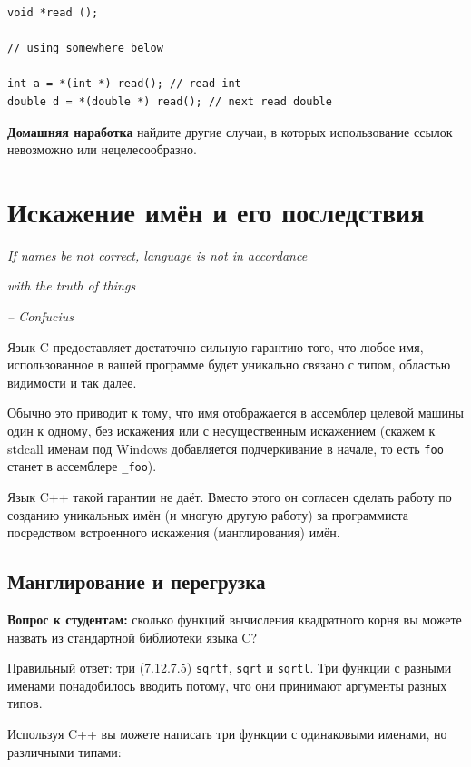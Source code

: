 \documentclass[a4paper,12pt,oneside]{book}
\begin{document}
\begin{lstlisting}
void *read ();

// using somewhere below

int a = *(int *) read(); // read int
double d = *(double *) read(); // next read double
\end{lstlisting}

\textbf{Домашняя наработка} найдите другие случаи, в которых использование ссылок невозможно или нецелесообразно.

\pagebreak
\section{Искажение имён и его последствия}\label{NameResolution}

\hfill\textit{If names be not correct, language is not in accordance}

\hfill\textit{with the truth of things}{\vspace{0.5em}}

\hfill\textit{-- Confucius}

Язык C предоставляет достаточно сильную гарантию того, что любое имя, использованное в вашей программе будет уникально связано с типом, областью видимости и так далее.

Обычно это приводит к тому, что имя отображается в ассемблер целевой машины один к одному, без искажения или с несущественным искажением (скажем к stdcall именам под Windows добавляется подчеркивание в начале, то есть \lstinline!foo! станет в ассемблере \lstinline!_foo!).

Язык C++ такой гарантии не даёт. Вместо этого он согласен сделать работу по созданию уникальных имён (и многую другую работу) за программиста посредством встроенного искажения (манглирования) имён. 

\subsection{Манглирование и перегрузка}\label{subsub:mangling}

\textbf{Вопрос к студентам:} сколько функций вычисления квадратного корня вы можете назвать из стандартной библиотеки языка C?

Правильный ответ: три (7.12.7.5) \lstinline!sqrtf!, \lstinline!sqrt! и \lstinline!sqrtl!. Три функции с разными именами понадобилось вводить потому, что они принимают аргументы разных типов.

Используя C++ вы можете написать три функции с одинаковыми именами, но различными типами:
\end{document}
